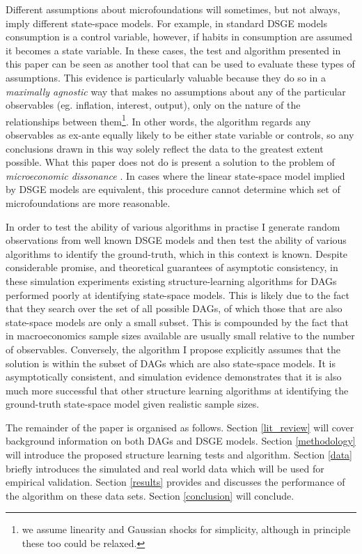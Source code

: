 \documentclass{article}
\begin{document}
Different assumptions about microfoundations will sometimes, but not always, imply different state-space models. For example, in standard DSGE models consumption is a control variable, however, if habits in consumption are assumed it becomes a state variable. In these cases, the test and algorithm presented in this paper can be seen as another tool that can be used to evaluate these types of assumptions. This evidence is particularly valuable because they do so in a \textit{maximally agnostic} way that makes no assumptions about any of the particular observables (eg. inflation, interest, output), only on the nature of the relationships between them\footnote{we assume linearity and Gaussian shocks for simplicity, although in principle these too could be relaxed.}. In other words, the algorithm regards any observables as ex-ante equally likely to be either state variable or controls, so any conclusions drawn in this way solely reflect the data to the greatest extent possible. What this paper does not do is present a solution to the problem of \textit{microeconomic dissonance} \parencite{levin2008macroeconometric}. In cases where the linear state-space model implied by DSGE models are equivalent, this procedure cannot determine which set of microfoundations are more reasonable.

In order to test the ability of various algorithms in practise I generate random observations from well known DSGE models and then test the ability of various algorithms to identify the ground-truth, which in this context is known. Despite considerable promise, and theoretical guarantees of asymptotic consistency, in these simulation experiments existing structure-learning algorithms for DAGs performed poorly at identifying state-space models. This is likely due to the fact that they search over the set of all possible DAGs, of which those that are also state-space models are only a small subset. This is compounded by the fact that in macroeconomics sample sizes available are usually small relative to the number of observables. Conversely, the algorithm I propose explicitly assumes that the solution is within the subset of DAGs which are also state-space models. It is asymptotically consistent, and simulation evidence demonstrates that it is also much more successful that other structure learning algorithms at identifying the ground-truth state-space model given realistic sample sizes.

The remainder of the paper is organised as follows. Section \ref{lit_review} will cover background information on both DAGs and DSGE models. Section \ref{methodology} will introduce the proposed structure learning tests and algorithm. Section \ref{data} briefly introduces the simulated and real world data which will be used for empirical validation. Section \ref{results} provides and discusses the performance of the algorithm on these data sets. Section \ref{conclusion} will conclude.  
\end{document}
